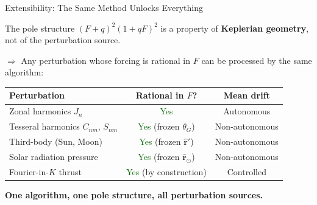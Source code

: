 \documentclass[aspectratio=169, 11pt]{beamer}
\newcommand{\good}[1]{\textcolor{darkgreen}{#1}}
\begin{document}
\begin{frame}{Extensibility: The Same Method Unlocks Everything}

The pole structure $(F+q)^2(1+qF)^2$ is a property of
\textbf{Keplerian geometry}, not of the perturbation source.

\vspace{0.3em}
$\Rightarrow$ Any perturbation whose forcing is rational in $F$ can be
processed by the same algorithm:

\vspace{0.3em}
\begin{center}
\begin{tabular}{lcc}
\toprule
Perturbation & Rational in $F$? & Mean drift \\
\midrule
Zonal harmonics $J_n$ & \good{Yes} & Autonomous \\
Tesseral harmonics $C_{nm}$, $S_{nm}$
    & \good{Yes} (frozen $\theta_G$) & Non-autonomous \\
Third-body (Sun, Moon)
    & \good{Yes} (frozen $\hat{\bm r}'$) & Non-autonomous \\
Solar radiation pressure
    & \good{Yes} (frozen $\hat{\bm r}_\odot$) & Non-autonomous \\
Fourier-in-$K$ thrust
    & \good{Yes} (by construction) & Controlled \\
\bottomrule
\end{tabular}
\end{center}

\vspace{0.2em}
\textbf{One algorithm, one pole structure, all perturbation sources.}

\end{frame}
\end{document}

